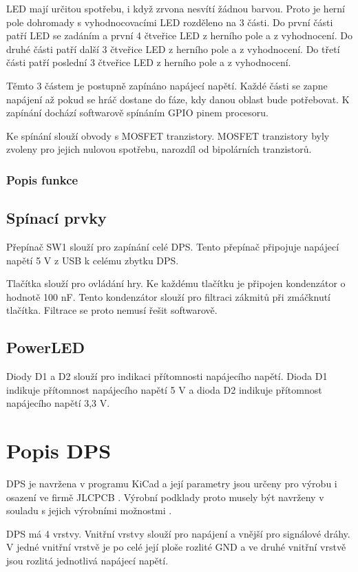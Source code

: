 LED mají určitou spotřebu, i když zrvona nesvítí žádnou barvou. Proto je herní pole dohromady s vyhodnocovacími LED rozděleno 
na 3 části. Do první části patří LED se zadáním a první 4 čtveřice LED z herního pole a z vyhodnocení. Do druhé části patří 
další 3 čtveřice LED z herního pole a z vyhodnocení. Do třetí části patří poslední 3 čtveřice LED z herního pole a z 
vyhodnocení.

Těmto 3 částem je postupně zapínáno napájecí napětí. Každé části se zapne napájení až pokud se hráč dostane do fáze, kdy 
danou oblast bude potřebovat. K zapínání dochází softwarově spínáním GPIO pinem procesoru.

Ke spínání slouží obvody s MOSFET tranzistory. MOSFET tranzistory byly zvoleny pro jejich nulovou spotřebu, narozdíl od 
bipolárních tranzistorů. 

\subsection{Popis funkce}

\section{Spínací prvky}
Přepínač SW1 slouží pro zapínání celé DPS. Tento přepínač připojuje napájecí napětí 5 V z USB k celému zbytku DPS.

Tlačítka slouží pro ovládání hry. Ke každému tlačítku je připojen kondenzátor o hodnotě 100 nF. Tento kondenzátor 
slouží pro filtraci zákmitů při zmáčknutí tlačítka. Filtrace se proto nemusí řešit softwarově.

\section{PowerLED}
Diody D1 a D2 slouží pro indikaci přítomnosti napájecího napětí.  Dioda D1 indikuje přítomnost napájecího napětí 
5 V a dioda D2 indikuje přítomnost napájecího napětí 3,3 V.

\chapter{Popis DPS}
DPS je navržena v programu KiCad a její parametry jsou určeny pro výrobu i osazení ve firmě JLCPCB \cite{JLCPCB}. Výrobní 
podklady proto musely být navrženy v souladu s jejich výrobními možnostmi \cite{JLCPCB_Capabilities}.

DPS má 4 vrstvy. Vnitřní vrstvy slouží pro napájení a vnější pro signálové dráhy. V jedné vnitřní vrstvě je po celé její ploše 
rozlité GND a ve druhé vnitřní vrstvě jsou rozlitá jednotlivá napájecí napětí.


